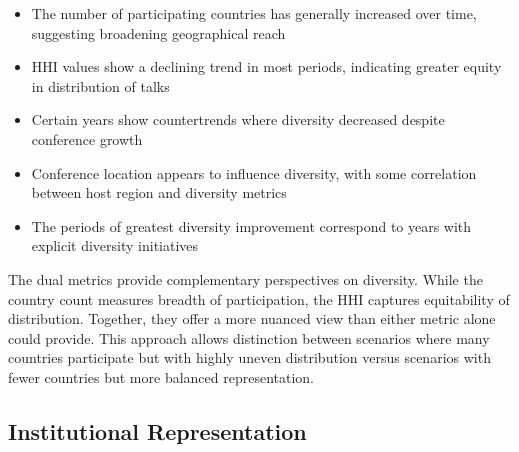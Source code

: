 \documentclass[a4paper,11pt]{article}
\begin{document}
\begin{itemize}
    \item The number of participating countries has generally increased over time, suggesting broadening geographical reach
    \item HHI values show a declining trend in most periods, indicating greater equity in distribution of talks
    \item Certain years show countertrends where diversity decreased despite conference growth
    \item Conference location appears to influence diversity, with some correlation between host region and diversity metrics
    \item The periods of greatest diversity improvement correspond to years with explicit diversity initiatives
\end{itemize}

The dual metrics provide complementary perspectives on diversity. While the country count measures breadth of participation, the HHI captures equitability of distribution. Together, they offer a more nuanced view than either metric alone could provide. This approach allows distinction between scenarios where many countries participate but with highly uneven distribution versus scenarios with fewer countries but more balanced representation.

\subsection{Institutional Representation}
\end{document}
